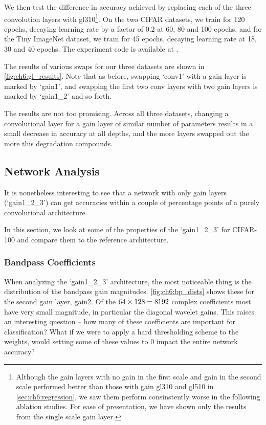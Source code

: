 We then test the difference in accuracy achieved by replacing each of the three
convolution layers with gl310\footnote{Although the gain layers with no gain in
the first scale and gain in the second scale performed better than those with
gain gl310 and gl510 in \autoref{sec:ch6:regression}, we saw them perform
consinstently worse in the following ablation studies. For ease of presentation,
we have shown only the results from the single scale gain layer.}. 
On the two CIFAR datasets, we train for 120 epochs, decaying learning rate by a
factor of 0.2 at 60, 80 and 100 epochs, and for the Tiny ImageNet dataset, we
train for 45 epochs, decaying learning rate at 18, 30 and 40 epochs. The
experiment code is available at \cite{}.

The results of various swaps for our three datasets are shown in
\autoref{fig:ch6:gl_results}.
Note that as before, swapping `conv1' with a gain layer is marked by `gain1',
and swapping the first two conv layers with two gain layers is marked by
`gain1\_2' and so forth.  

The results are not too promising. Across all three datasets, changing a
convolutional layer for a gain layer of similar number of parameters
results in a small decrease in accuracy at all depths, and the more layers
swapped out the more this degradation compounds.


\subsection{Network Analysis}
It is nonetheless interesting to see that a network with only gain layers
(`gain1\_2\_3') can get accuracies within a couple of percentage points of a
purely convolutional architecture. 

In this section, we look at some of the properties of the `gain1\_2\_3' for
CIFAR-100 and compare them to the reference architecture.

\subsubsection{Bandpass Coefficients}
When analyzing the `gain1\_2\_3' architecture, the most noticeable thing is the
distribution of the bandpass gain magnitudes. \autoref{fig:ch6:bp_dists} shows
these for the second gain layer, gain2. Of the $64\times 128=8192$ complex
coefficients most have very small magnitude, in particular the diagonal wavelet
gains. This raises an interesting question -- how many of these coefficients are
important for classification? What if we were to apply a hard thresholding
scheme to the weights, would setting some of these values to 0 impact the
entire network accuracy? 

